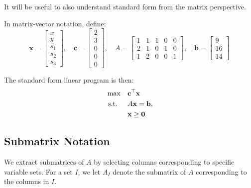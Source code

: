 It will be useful to also understand standard form from the matrix perspective.

\begin{tcolorbox}[colback=gray!5!white, colframe=gray!75!black,    
    width=0.8\textwidth, %
    box align=center, 
    title=\textbf{Matrix-Vector Standard Form}]
\noindent In matrix-vector notation, define:
\[
\mathbf{x} = 
\begin{bmatrix}
x \\
y \\
s_1 \\
s_2 \\
s_3
\end{bmatrix},
\quad
\mathbf{c} =
\begin{bmatrix}
2 \\
3 \\
0 \\
0 \\
0
\end{bmatrix},
\quad
A =
\begin{bmatrix}
1 & 1 & 1 & 0 & 0 \\
2 & 1 & 0 & 1 & 0 \\
1 & 2 & 0 & 0 & 1
\end{bmatrix},
\quad
\mathbf{b} =
\begin{bmatrix}
9 \\
16 \\
14
\end{bmatrix}
\]

\bigskip

\noindent The standard form linear program is then:
\[
\begin{aligned}
\max \quad & \mathbf{c}^\top \mathbf{x} \\
\text{ s.t. } \quad & A\mathbf{x} = \mathbf{b}, \\
& \mathbf{x} \geq \mathbf{0}
\end{aligned}
\]

\end{tcolorbox}

\subsection*{Submatrix Notation}
We extract submatrices of \( A \) by selecting columns corresponding to specific variable sets.  
For a set \( I \), we let \( A_I \) denote the submatrix of \( A \) corresponding to the columns in \( I \).

\bigskip

